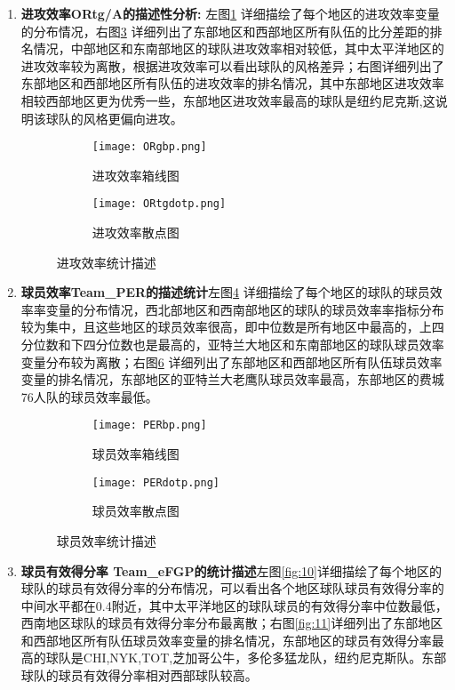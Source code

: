 \begin{enumerate}
\item {\bfseries 进攻效率ORtg/A的描述性分析:  }左图\ref{fig:6} 详细描绘了每个地区的进攻效率变量的分布情况，右图\ref{fig:7} 详细列出了东部地区和西部地区所有队伍的比分差距的排名情况，中部地区和东南部地区的球队进攻效率相对较低，其中太平洋地区的进攻效率较为离散，根据进攻效率可以看出球队的风格差异；右图详细列出了东部地区和西部地区所有队伍的进攻效率的排名情况，其中东部地区进攻效率相较西部地区更为优秀一些，东部地区进攻效率最高的球队是纽约尼克斯,这说明该球队的风格更偏向进攻。
\begin{figure}[h!]
	
	\begin{subfigure}{0.5\textwidth}
		\texttt{[image: ORgbp.png]} 
		\caption{进攻效率箱线图}
		\label{fig:6}
	\end{subfigure}
	\begin{subfigure}{0.5\textwidth}
		\texttt{[image: ORtgdotp.png]}
		\caption{进攻效率散点图}
		\label{fig:7}
	\end{subfigure}
	\caption{进攻效率统计描述}
\end{figure}


\item {\bfseries 球员效率Team\_PER的描述统计}左图\ref{fig:8} 详细描绘了每个地区的球队的球员效率率变量的分布情况，西北部地区和西南部地区的球队的球员效率率指标分布较为集中，且这些地区的球员效率很高，即中位数是所有地区中最高的，上四分位数和下四分位数也是最高的，亚特兰大地区和东南部地区的球队球员效率变量分布较为离散；右图\ref{fig:9} 详细列出了东部地区和西部地区所有队伍球员效率变量的排名情况，东部地区的亚特兰大老鹰队球员效率最高，东部地区的费城76人队的球员效率最低。
\begin{figure}[h!]
	
	\begin{subfigure}{0.5\textwidth}
		\texttt{[image: PERbp.png]} 
		\caption{球员效率箱线图}
		\label{fig:8}
	\end{subfigure}
	\begin{subfigure}{0.5\textwidth}
		\texttt{[image: PERdotp.png]}
		\caption{球员效率散点图}
		\label{fig:9}
	\end{subfigure}
	\caption{球员效率统计描述}
\end{figure}

\newpage
\item {\bfseries 球员有效得分率 Team\_eFGP的统计描述}左图\ref{fig:10}详细描绘了每个地区的球队的球员有效得分率的分布情况，可以看出各个地区球队球员有效得分率的中间水平都在0.4附近，其中太平洋地区的球队球员的有效得分率中位数最低，西南地区球队的球员有效得分率分布最离散；右图\ref{fig:11}详细列出了东部地区和西部地区所有队伍球员效率变量的排名情况，东部地区的球员有效得分率最高的球队是CHI,NYK,TOT,芝加哥公牛，多伦多猛龙队，纽约尼克斯队。东部球队的球员有效得分率相对西部球队较高。


\end{enumerate}
